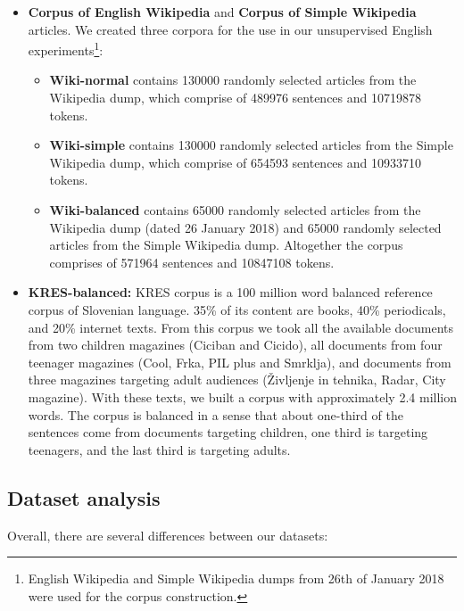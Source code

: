 \documentclass{clv3}
\begin{document}
\begin{itemize}
    \item { \bf Corpus of English Wikipedia} and {\bf Corpus of Simple Wikipedia} articles. We created three corpora for the use in our unsupervised English experiments\footnote{English Wikipedia and Simple Wikipedia dumps from 26th of January 2018 were used for the corpus construction.}:
    
    \begin{itemize}
        \item \textbf{Wiki-normal} contains \num{130000} randomly selected articles from the Wikipedia dump, which comprise of \num{489976} sentences and \num{10719878} tokens.
        \item \textbf{Wiki-simple} contains \num{130000} randomly selected articles from the Simple Wikipedia dump, which comprise of \num{654593} sentences and \num{10933710} tokens.
        \item \textbf{Wiki-balanced} contains \num{65000} randomly selected articles from the Wikipedia dump (dated 26 January 2018) and \num{65000} randomly selected articles from the Simple Wikipedia dump. Altogether the corpus comprises of  \num{571964} sentences and \num{10847108} tokens. 
    \end{itemize}{}
    
    \item { \bf KRES-balanced:}  KRES corpus \citep{logar2012korpusi} is a 100 million word balanced reference corpus of Slovenian language. 35\% of its content are books, 40\% periodicals, and 20\% internet texts. From this corpus we took all the available documents from two children magazines (Ciciban and Cicido), all documents from four teenager magazines (Cool, Frka, PIL plus and Smrklja), and documents from three magazines targeting adult audiences (\v{Z}ivljenje in tehnika, Radar, City magazine). With these texts, we built a corpus with approximately 2.4 million words. The corpus is balanced in a sense that about one-third of the sentences come from documents targeting children, one third is targeting teenagers, and the last third is targeting adults.
\end{itemize}


\subsection{Dataset analysis}
\label{sec:dataset-analysis}

Overall, there are several differences between our datasets:
\end{document}
